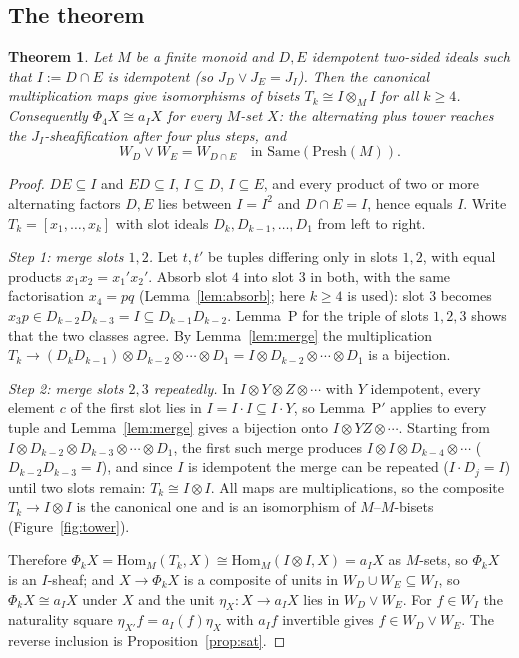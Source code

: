 \documentclass[11pt]{amsart}
\newtheorem{thm}{Theorem}[section]
\theoremstyle{definition}
\newcommand{\Same}{\mathrm{Same}}
\newcommand{\Presh}{\mathrm{Presh}}
\newcommand{\Hom}{\mathrm{Hom}}
\begin{document}
\subsection{The theorem}
\begin{thm}\label{thm:monoid}
Let $M$ be a finite monoid and $D,E$ idempotent two-sided ideals such that
$I:=D\cap E$ is idempotent (so $J_D\vee J_E=J_I$). Then the canonical
multiplication maps give isomorphisms of bisets $T_k\cong I\otimes_MI$ for all
$k\ge4$. Consequently $\Phi_4X\cong a_IX$ for every $M$-set $X$: the alternating
plus tower reaches the $J_I$-sheafification after four plus steps, and
\[
W_D\vee W_E=W_{D\cap E}\quad\text{in }\Same(\Presh(M)).
\]
\end{thm}
\begin{proof}
$DE\subseteq I$ and $ED\subseteq I$, $I\subseteq D$, $I\subseteq E$, and every
product of two or more alternating factors $D,E$ lies between $I=I^2$ and
$D\cap E=I$, hence equals $I$. Write $T_k=[x_1,\dots,x_k]$ with slot ideals
$D_k,D_{k-1},\dots,D_1$ from left to right.

\emph{Step 1: merge slots $1,2$.} Let $t,t'$ be tuples differing only in slots
$1,2$, with equal products $x_1x_2=x_1'x_2'$. Absorb slot $4$ into slot $3$
in both, with the same factorisation $x_4=pq$ (Lemma~\ref{lem:absorb}; here
$k\ge4$ is used): slot $3$ becomes $x_3p\in D_{k-2}D_{k-3}=I\subseteq
D_{k-1}D_{k-2}$. Lemma~P for the triple of slots $1,2,3$ shows that the two
classes agree. By Lemma~\ref{lem:merge} the multiplication
$T_k\to(D_kD_{k-1})\otimes D_{k-2}\otimes\cdots\otimes D_1=I\otimes D_{k-2}\otimes
\cdots\otimes D_1$ is a bijection.

\emph{Step 2: merge slots $2,3$ repeatedly.} In $I\otimes Y\otimes Z\otimes\cdots$
with $Y$ idempotent, every element $c$ of the first slot lies in $I=I\cdot I
\subseteq I\cdot Y$, so Lemma~P$'$ applies to every tuple and
Lemma~\ref{lem:merge} gives a bijection onto $I\otimes YZ\otimes\cdots$. Starting
from $I\otimes D_{k-2}\otimes D_{k-3}\otimes\cdots\otimes D_1$, the first such
merge produces $I\otimes I\otimes D_{k-4}\otimes\cdots$ ($D_{k-2}D_{k-3}=I$), and
since $I$ is idempotent the merge can be repeated ($I\cdot D_j=I$) until two
slots remain: $T_k\cong I\otimes I$. All maps are multiplications, so the
composite $T_k\to I\otimes I$ is the canonical one and is an isomorphism of
$M$--$M$-bisets (Figure~\ref{fig:tower}).

Therefore $\Phi_kX=\Hom_M(T_k,X)\cong\Hom_M(I\otimes I,X)=a_IX$ as $M$-sets, so
$\Phi_kX$ is an $I$-sheaf; and $X\to\Phi_kX$ is a composite of units in
$W_D\cup W_E\subseteq W_I$, so $\Phi_kX\cong a_IX$ under $X$ and the unit
$\eta_X\colon X\to a_IX$ lies in $W_D\vee W_E$. For $f\in W_I$ the naturality
square $\eta_{X'}f=a_I(f)\eta_X$ with $a_If$ invertible gives $f\in W_D\vee W_E$.
The reverse inclusion is Proposition~\ref{prop:sat}.
\end{proof}
\end{document}
